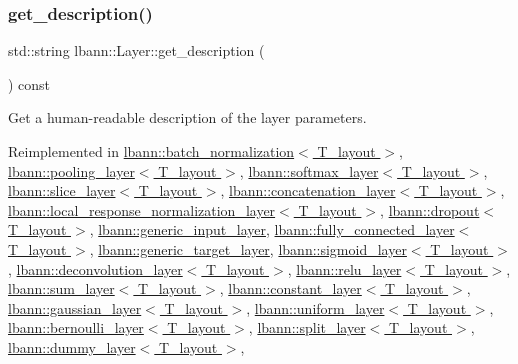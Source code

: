 \subsubsection{\texorpdfstring{get\+\_\+description()}{get\_description()}}
{\footnotesize\ttfamily std\+::string lbann\+::\+Layer\+::get\+\_\+description (\begin{DoxyParamCaption}{ }\end{DoxyParamCaption}) const\hspace{0.3cm}{\ttfamily [virtual]}}

Get a human-\/readable description of the layer parameters. 

Reimplemented in \hyperlink{classlbann_1_1batch__normalization_a331738f02157f9e1e21f212c41feb86c}{lbann\+::batch\+\_\+normalization$<$ T\+\_\+layout $>$}, \hyperlink{classlbann_1_1pooling__layer_a11f6d5c7ef16a62d081164f174825ab2}{lbann\+::pooling\+\_\+layer$<$ T\+\_\+layout $>$}, \hyperlink{classlbann_1_1softmax__layer_afc8ecde99bde8cbacae5dc1779052d1d}{lbann\+::softmax\+\_\+layer$<$ T\+\_\+layout $>$}, \hyperlink{classlbann_1_1slice__layer_aa61c1f449a9f741f523921129dfb88e5}{lbann\+::slice\+\_\+layer$<$ T\+\_\+layout $>$}, \hyperlink{classlbann_1_1concatenation__layer_a2154ad33b4bacbb5caed95fdebc735ca}{lbann\+::concatenation\+\_\+layer$<$ T\+\_\+layout $>$}, \hyperlink{classlbann_1_1local__response__normalization__layer_a31f4ab1700e2e1c69a0ccb44c6f0fd69}{lbann\+::local\+\_\+response\+\_\+normalization\+\_\+layer$<$ T\+\_\+layout $>$}, \hyperlink{classlbann_1_1dropout_a7b53ee7d758337fe40788a567b5d092c}{lbann\+::dropout$<$ T\+\_\+layout $>$}, \hyperlink{classlbann_1_1generic__input__layer_a8ffe91a3d5b6f37d2dc17e657898dcc8}{lbann\+::generic\+\_\+input\+\_\+layer}, \hyperlink{classlbann_1_1fully__connected__layer_a7ce678ec7560dd145244ffd8813d5edb}{lbann\+::fully\+\_\+connected\+\_\+layer$<$ T\+\_\+layout $>$}, \hyperlink{classlbann_1_1generic__target__layer_aa2db5ccc0bbd40f081c8ff4501f3fc29}{lbann\+::generic\+\_\+target\+\_\+layer}, \hyperlink{classlbann_1_1sigmoid__layer_aa921ef4370e6b4fae38536310d7a3a17}{lbann\+::sigmoid\+\_\+layer$<$ T\+\_\+layout $>$}, \hyperlink{classlbann_1_1deconvolution__layer_a07f211e08383fe8e26b6e1b916136b67}{lbann\+::deconvolution\+\_\+layer$<$ T\+\_\+layout $>$}, \hyperlink{classlbann_1_1relu__layer_a57d00fb2f9c90f5132ddea44d3ccc099}{lbann\+::relu\+\_\+layer$<$ T\+\_\+layout $>$}, \hyperlink{classlbann_1_1sum__layer_a73e45687c97990d88a2e31dc177ef56e}{lbann\+::sum\+\_\+layer$<$ T\+\_\+layout $>$}, \hyperlink{classlbann_1_1constant__layer_a2745baa79137db746795634144b99080}{lbann\+::constant\+\_\+layer$<$ T\+\_\+layout $>$}, \hyperlink{classlbann_1_1gaussian__layer_a0a062897d0660c9a494c98d800aac9e9}{lbann\+::gaussian\+\_\+layer$<$ T\+\_\+layout $>$}, \hyperlink{classlbann_1_1uniform__layer_a41b8f6ed59de66dda1f95a6b4ee4762f}{lbann\+::uniform\+\_\+layer$<$ T\+\_\+layout $>$}, \hyperlink{classlbann_1_1bernoulli__layer_a9d46943959793d5ba5e5eebe26063dad}{lbann\+::bernoulli\+\_\+layer$<$ T\+\_\+layout $>$}, \hyperlink{classlbann_1_1split__layer_a3e599c39385b1d707ad9f28454f52cf5}{lbann\+::split\+\_\+layer$<$ T\+\_\+layout $>$}, \hyperlink{classlbann_1_1dummy__layer_ab4921788ac99636ba95ba51aaa4394fe}{lbann\+::dummy\+\_\+layer$<$ T\+\_\+layout $>$}, 